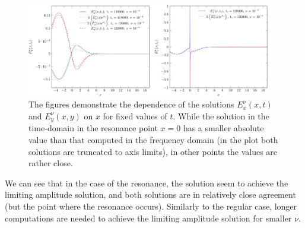 \begin{figure}
\includegraphics[width=0.95\textwidth]{res/ex_fixed_t_1e4_2-crop.pdf}
\caption{The figures demonstrate the dependence of the solutions 
$E_x^{\nu}(x,t)$ and $E_y^{\nu}(x,y)$ on $x$ for fixed values of $t$. While the solution in the time-domain 
in the resonance point $x=0$ has a smaller absolute value than that computed in the frequency domain (in the plot both solutions are truncated to 
axis limits), in other points the values are rather close. }
\label{fig:resonance_nus_eyx_t}
\end{figure}

We can see that in the case of the resonance, the solution seem to achieve the limiting amplitude solution, 
and both solutions are in relatively close agreement (but the point where the resonance occurs). 
Similarly to %
the regular case, 
longer computations are needed to achieve the limiting amplitude solution  
for smaller $\nu$.

